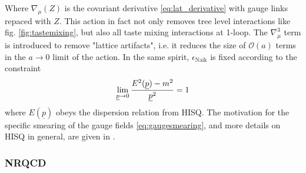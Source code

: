 \documentclass[a4paper,10pt]{article}
\numberwithin{equation}{section}
\begin{document}
Where $\nabla_{\mu}(Z)$ is the covariant derivative \eqref{eq:lat_derivative} with gauge links repaced with $Z$. This action in fact not only removes tree level interactions like fig. \ref{fig:tastemixing}, but also all taste mixing interactions at 1-loop. The $\nabla^3_{\mu}$ term is introduced to remove "lattice artifacts", i.e. it reduces the size of $\mathcal{O}(a)$ terms in the $a\to 0$ limit of the action. In the same spirit, $\epsilon_{\text{Naik}}$ is fixed according to the constraint
\begin{align}
	\lim_{\underline{p}\to 0} {E^2(\underline{p})-m^2\over \underline{p}^2} = 1
\end{align}
where $E(\underline{p})$ obeys the dispersion relation from HISQ. The motivation for the specific smearing of the gauge fields \eqref{eq:gaugesmearing}, and more details on HISQ in general, are given in \cite{Follana:2006rc}.

\subsubsection{NRQCD}
\end{document}
